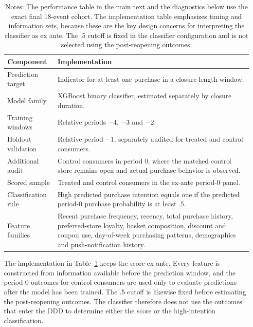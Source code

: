 \documentclass[11 pt]{article}
\newcommand\fnote[1]{\captionsetup{font=footnotesize}\caption*{#1}}
\begin{document}
\begin{table}[!ht]
\centering
\caption{Classifier implementation details}
\label{tab:appendix_classifier_implementation}
\small
\begin{tabularx}{\textwidth}{p{4.0cm}X}
\toprule
Component & Implementation \\
\midrule
Prediction target & Indicator for at least one purchase in a closure-length window. \\
Model family & XGBoost binary classifier, estimated separately by closure duration. \\
Training windows & Relative periods $-4$, $-3$ and $-2$. \\
Holdout validation & Relative period $-1$, separately audited for treated and control consumers. \\
Additional audit & Control consumers in period $0$, where the matched control store remains open and actual purchase behavior is observed. \\
Scored sample & Treated and control consumers in the ex-ante period-$0$ panel. \\
Classification rule & High predicted purchase intention equals one if the predicted period-$0$ purchase probability is at least .5. \\
Feature families & Recent purchase frequency, recency, total purchase history, preferred-store loyalty, basket composition, discount and coupon use, day-of-week purchasing patterns, demographics and push-notification history. \\
\bottomrule
\end{tabularx}
\vspace{1mm}
\fnote{Notes: The performance table in the main text and the diagnostics below use the exact final 18-event cohort. The implementation table emphasizes timing and information sets, because these are the key design concerns for interpreting the classifier as ex ante. The .5 cutoff is fixed in the classifier configuration and is not selected using the post-reopening outcomes.}
\end{table}

The implementation in Table~\ref{tab:appendix_classifier_implementation} keeps the score ex ante. Every feature is constructed from information available before the prediction window, and the period-$0$ outcomes for control consumers are used only to evaluate predictions after the model has been trained. The .5 cutoff is likewise fixed before estimating the post-reopening outcomes. The classifier therefore does not use the outcomes that enter the DDD to determine either the score or the high-intention classification.
\end{document}
